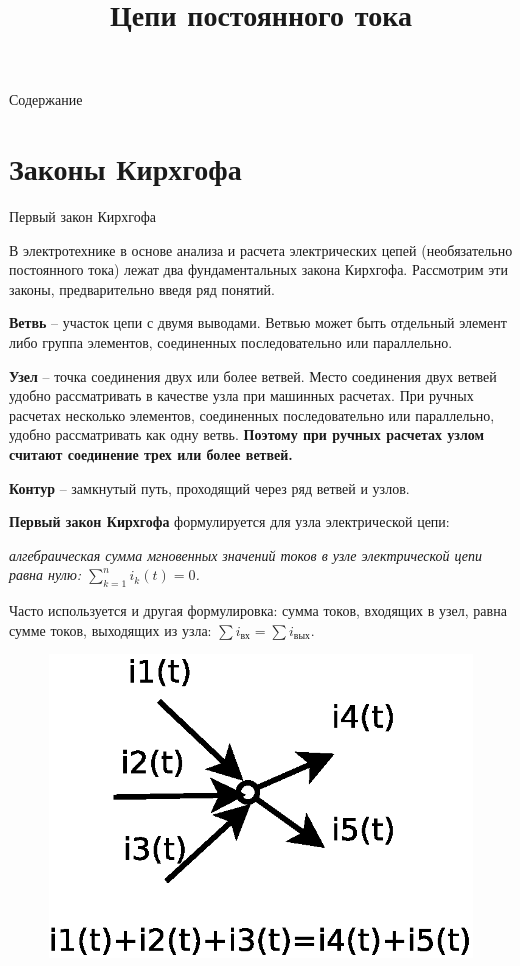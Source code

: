 \documentclass[10pt, pdf, hyperref={unicode},handout]{beamer}
\title[Лекция 2]{\Huge{Цепи постоянного тока}}
\author[\textcopyright   Артамонов Ю.Н.]{}
\institute[]{}
\date{}
\begin{document}
\begin{frame}
  \titlepage
\end{frame}

\begin{frame}{Содержание}
  \tableofcontents
\end{frame}

\section{Законы Кирхгофа}


\begin{frame}{Первый закон Кирхгофа}
  \begin{block}

    \small{
      В электротехнике в основе анализа и расчета электрических цепей (необязательно постоянного тока) лежат  два фундаментальных закона Кирхгофа. Рассмотрим эти законы, предварительно введя ряд понятий.

\textbf{Ветвь} – участок цепи с двумя выводами. Ветвью может быть отдельный
элемент либо группа элементов, соединенных последовательно или параллельно.

\textbf{Узел} – точка соединения двух или более ветвей. Место соединения
двух ветвей удобно рассматривать в качестве узла при машинных расчетах.
При ручных расчетах несколько элементов, соединенных последовательно
или параллельно, удобно рассматривать как одну ветвь. \textbf{Поэтому при ручных
расчетах узлом считают соединение трех или более ветвей.}

\textbf{Контур} – замкнутый путь, проходящий через ряд ветвей и узлов.

\textbf{Первый закон Кирхгофа} формулируется для узла электрической цепи:

\textit{алгебраическая сумма мгновенных значений токов в узле электрической цепи равна нулю: $\sum_{k=1}^{n}i_k(t)=0$.}

Часто используется и другая формулировка: сумма токов, входящих в узел, равна сумме токов, выходящих из узла: $\sum i_{\text{вх}}=\sum i_{\text{вых}}$.
\begin{figure}[htb] 
    \centering
    \includegraphics [scale=0.5]{ris1.eps}
    

\end{figure}}
\end{block}
\end{frame}
\end{document}
